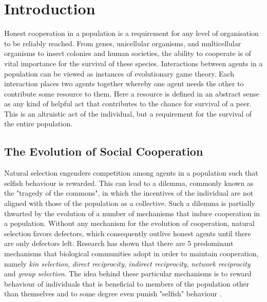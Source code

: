 \chapter{Introduction}
\label{chap:Introduction}



\noindent{}Honest cooperation in a population is a requirement for any level of organisation to be reliably reached. From genes, unicellular organisms, and multicellular organisms to insect colonies and human societies, the ability to cooperate is of vital importance for the survival of these species. Interactions between agents in a population can be viewed as instances of evolutionary game theory. Each interaction places two agents together whereby one agent needs the other to contribute some resource to them. Here a resource is defined in an abstract sense as any kind of helpful act that contributes to the chance for survival of a peer. This is an altruistic act of the individual, but a requirement for the survival of the entire population.\vspace{1em}\\


\section{The Evolution of Social Cooperation}
\label{sec:The Evolution of Cooperation}
\noindent{}Natural selection engenders competition among agents in a population such that selfish behaviour is rewarded. This can lead to a dilemma, commonly known as the "tragedy of the commons", in which the incentives of the individual are not aligned with those of the population as a collective. Such a dilemma is partially thwarted by the evolution of a number of mechanisms that induce cooperation in a population. Without any mechanism for the evolution of cooperation, natural selection favors defectors, which consequently outlive honest agents until there are only defectors left. Research has shown that there are 5 predominant mechanisms that biological communities adopt in order to maintain cooperation, namely {\it kin selection}, {\it direct reciprocity}, {\it indirect reciprocity}, {\it network reciprocity} and {\it group selection}. The idea behind these particular mechanisms is to reward behaviour of individuals that is beneficial to members of the population other than themselves and to some degree even punish "selfish" behaviour \cite{5 Rules for the Evolution of Cooperation}.\vspace{1em}\\



